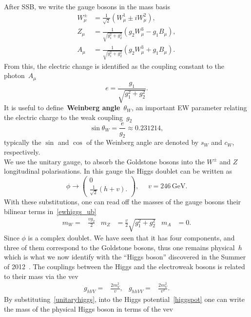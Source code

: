 After SSB, we write the gauge bosons in the mass basis~
\begin{align}
W_\mu^\pm &= \frac{1}{\sqrt{2}} (W^1_\mu\pm iW^2_\mu), \nonumber \\
Z_\mu &= \frac{1}{\sqrt{g_1^2+g_2^2}} \left(g_2 W^3_\mu-g_1B_\mu\right), \\
A_\mu &= \frac{1}{\sqrt{g_1^2+g_2^2}} \left(g_2 W^3_\mu+g_1B_\mu\right). \nonumber
 \end{align}
 From this, the electric change is identified as the coupling constant to the photon~$A_\mu$ 
 \begin{equation}
     e=\frac{g_1}{\sqrt{g_1^2+g_2^2}}.
 \end{equation}
 It is useful to define~\textbf{Weinberg angle}~$\theta_W$, an important EW parameter relating the electric charge to the weak coupling~$g_2$ 
 \begin{equation}
     \sin \theta_W = \frac{e}{g_2} \approx 0.231214,
 \end{equation}
 typically the $\sin$ and $\cos$ of the Weinberg angle are denoted by $s_W$ and $c_W$, respectively. \\ We use the unitary gauge, to absorb the Goldstone bosons into the $W^\pm$ and $Z$ longitudinal polarisations. In this gauge the Higgs doublet can be written as
\begin{equation}
    \phi \to \begin{pmatrix}
       0\\  \frac{1}{\sqrt{2}}(h+v).
    \end{pmatrix}, \,\,\,\,\,\,\,\, v= 246\, \mathrm{GeV}.
    \label{unitaryhiggs}
  \end{equation}
With these substitutions, one can read off the masses of the gauge bosons their bilinear terms in~\eqref{ewhiggs_ub}
\begin{align}
    m_W =& \frac{vg_2}{2} & m_Z&=\frac{v}{2}\sqrt{g_1^2+g_2^2} & m_A &= 0.
\end{align}
Since $\phi$ is a complex doublet. We have seen that it has four components,  and three of them correspond to the Goldstone bosons, thus one remains physical~$h$ which is what we now identify with the ``Higgs boson'' discovered in the Summer of 2012~\cite{CMS:2012qbp,ATLAS:2012yve}. The couplings between  the Higgs and the electroweak bosons is related to their mass via the vev 
\begin{align}
    g_{hVV} =& \frac{2 m_V^2}{v}, & g_{hhVV}=& \frac{2 m_V^2}{v^2}.
\end{align}
By substituting~\eqref{unitaryhiggs}, into the Higgs potential~\eqref{higgspot} one can write the mass of the physical Higgs boson in terms of the vev
